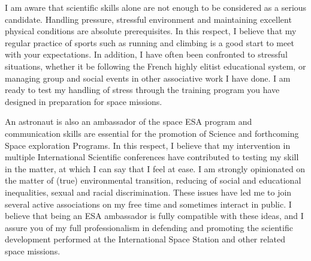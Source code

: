 \documentclass[11pt,a4paper,sans]{moderncv}        %
\begin{document}
I am aware that scientific skills alone are not enough to be considered as a serious candidate. Handling pressure, stressful environment and maintaining excellent physical conditions are absolute prerequisites. In this respect, I believe that my regular practice of sports such as running and climbing is a good start to meet with your expectations. In addition, I have often been confronted to stressful situations, whether it be following the French highly elitist educational system, or managing group and social events in other associative work I have done. I am ready to test my handling of stress through the training program you have designed in preparation for space missions.\\

\newpage 

An astronaut is also an ambassador of the space ESA program and communication skills are essential for the promotion of Science and forthcoming Space exploration Programs. In this respect, I believe that my intervention in multiple International Scientific conferences have contributed to testing my skill in the matter, at which I can say that I feel at ease. I am strongly opinionated on the matter of (true) environmental transition, reducing of social and educational inequalities, sexual and racial discrimination. These issues have led me to join several active associations on my free time and sometimes interact in public. I believe that being an ESA ambassador is fully compatible with these ideas, and I assure you of my full professionalism in defending and promoting the scientific development performed at the International Space Station and other related space missions.





\makeletterclosing
\end{document}
